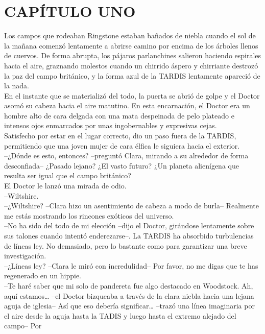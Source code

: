 \chapter*{CAPÍTULO UNO}

Los campos que rodeaban Ringstone estaban bañados de niebla cuando el
sol de la mañana comenzó lentamente a abrirse camino por encima de los
árboles llenos de cuervos. De forma abrupta, los pájaros parlanchines
salieron haciendo espirales hacia el aire, graznando molestos cuando un
chirrido áspero y chirriante destrozó la paz del campo británico, y la
forma azul de la TARDIS lentamente apareció de la nada.\\
En el instante que se materializó del todo, la puerta se abrió de golpe
y el Doctor asomó su cabeza hacia el aire matutino. En esta encarnación,
el Doctor era un hombre alto de cara delgada con una mata despeinada de
pelo plateado e intensos ojos enmarcados por unas ingobernables y
expresivas cejas.\\
Satisfecho por estar en el lugar correcto, dio un paso fuera de la
TARDIS, permitiendo que una joven mujer de cara élfica le siguiera hacia
el exterior.\\
--¿Dónde es esto, entonces? --preguntó Clara, mirando a su alrededor de
forma desconfiada-- ¿Pasado lejano? ¿El vasto futuro? ¿Un planeta
alienígena que resulta ser igual que el campo británico?\\
El Doctor le lanzó una mirada de odio.\\
--Wiltshire.\\
--¿Wiltshire? --Clara hizo un asentimiento de cabeza a modo de burla--
Realmente me estás mostrando los rincones exóticos del universo.\\
--No ha sido del todo de mi elección --dijo el Doctor, girándose
lentamente sobre sus talones cuando intentó enderezarse--. La TARDIS ha
absorbido turbulencias de líneas ley. No demasiado, pero lo bastante
como para garantizar una breve investigación.\\
--¿Líneas ley? --Clara le miró con incredulidad-- Por favor, no me digas
que te has regenerado en un hippie.\\
--Te haré saber que mi solo de pandereta fue algo destacado en
Woodstock. Ah, aquí estamos\ldots{} --el Doctor bizqueaba a través de la
clara niebla hacia una lejana aguja de iglesia-- Así que eso debería
significar\ldots{} --trazó una línea imaginaria por el aire desde la
aguja hasta la TADIS y luego hasta el extremo alejado del campo-- Por
